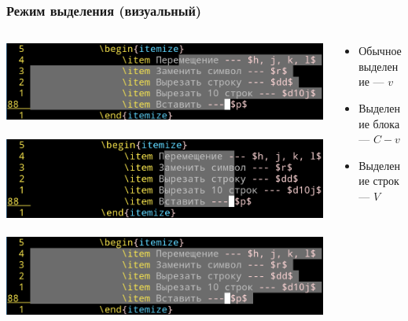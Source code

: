 \documentclass[aspectratio=169]{beamer}
\begin{document}
    \begin{frame}\frametitle{Режим выделения (визуальный)}
        \begin{columns}[T,onlytextwidth]
            \begin{column}{0.5\textwidth}
                \includegraphics[width=\textwidth]{visual_v}\\~\\
                \includegraphics[width=\textwidth]{visual_C-v}\\~\\
                \includegraphics[width=\textwidth]{visual_V}\\~\\
            \end{column}
            \begin{column}{0.5\textwidth}
                \begin{itemize}
                    \item Обычное выделение --- $v$\\
                    \item Выделение блока --- $C-v$\\
                    \item Выделение строк --- $V$\\
                \end{itemize}
            \end{column}
        \end{columns}
    \end{frame}
\end{document}
